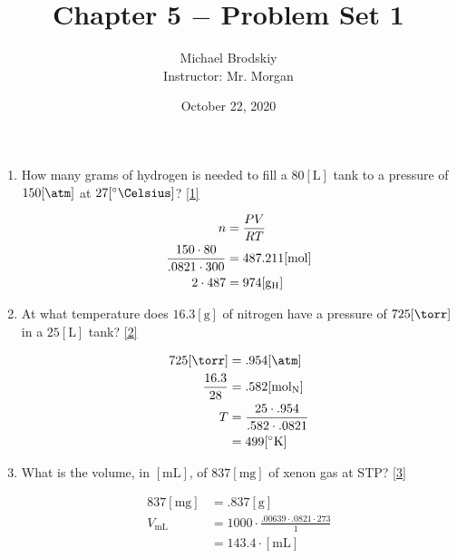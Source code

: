 \documentclass[12pt]{article}
\title{Chapter 5 $-$ Problem Set 1}
\date{October 22, 2020}
\author{Michael Brodskiy\\ \small Instructor: Mr. Morgan}
\begin{document}
\maketitle

\begin{enumerate}

  \item How many grams of hydrogen is needed to fill a $80[\si{\liter}]$ tank to a pressure of $150[\si{\atm}]$ at $27[^{\circ}\si{\Celsius}]$? \eqref{1}

    \begin{equation}
      \begin{split}
        n&=\frac{PV}{RT}\\
        \frac{150\cdot80}{.0821\cdot300}&=487.211[\si{\mole}]\\
        2\cdot487&=974[\si{\gram}_{\ce{H}}]\\
      \end{split}
      \label{1}
    \end{equation}

  \item At what temperature does $16.3[\si{\gram}]$ of nitrogen have a pressure of $725[\si{\torr}]$ in a $25[\si{\liter}]$ tank? \eqref{2}

    \begin{equation}
      \begin{split}
      725[\si{\torr}]&=.954[\si{\atm}]\\
      \frac{16.3}{28}&=.582[\si{\mole}_{\ce{N}}]\\
      T&=\frac{25\cdot.954}{.582\cdot.0821}\\
      &=499[^{\circ}\si{\kelvin}]
    \end{split}
      \label{2}
    \end{equation}

  \item What is the volume, in $[\si{\milli\liter}]$, of $837[\si{\milli\gram}]$ of xenon gas at STP? \eqref{3}

      \begin{equation}
        \begin{split}
          837[\si{\milli\gram}]&=.837[\si{\gram}]\\
          V_{\si{\milli\liter}}&=1000\cdot\frac{.00639\cdot.0821\cdot273}{1}\\
          &=143.4\cdot[\si{\milli\liter}]
        \end{split}
        \label{3}
      \end{equation}


\end{enumerate}
\end{document}
